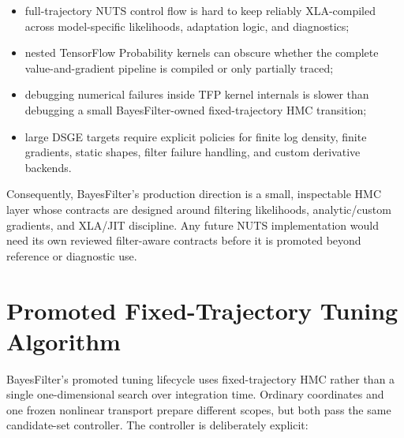 \begin{itemize}
  \item full-trajectory NUTS control flow is hard to keep reliably XLA-compiled
    across model-specific likelihoods, adaptation logic, and diagnostics;
  \item nested TensorFlow Probability kernels can obscure whether the complete
    value-and-gradient pipeline is compiled or only partially traced;
  \item debugging numerical failures inside TFP kernel internals is slower than
    debugging a small BayesFilter-owned fixed-trajectory HMC transition;
  \item large DSGE targets require explicit policies for finite log density,
    finite gradients, static shapes, filter failure handling, and custom
    derivative backends.
\end{itemize}

Consequently, BayesFilter's production direction is a small, inspectable HMC
layer whose contracts are designed around filtering likelihoods,
analytic/custom gradients, and XLA/JIT discipline. Any future NUTS
implementation would need its own reviewed filter-aware contracts before it is
promoted beyond reference or diagnostic use.

\section{Promoted Fixed-Trajectory Tuning Algorithm}
\label{sec:bf-promoted-fixed-trajectory-hmc-tuning}

BayesFilter's promoted tuning lifecycle uses fixed-trajectory HMC rather than a
single one-dimensional search over integration time.  Ordinary coordinates and
one frozen nonlinear transport prepare different scopes, but both pass the
same candidate-set controller.  The controller is deliberately explicit:

